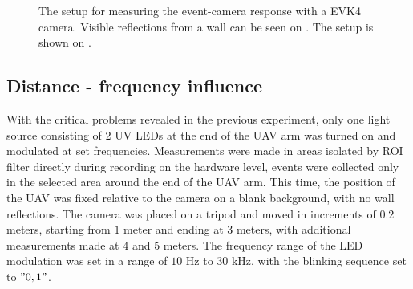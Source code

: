 \begin{figure}[H]
	\centering
	\caption{
  The setup for measuring the event-camera response with a EVK4 camera. Visible reflections from a wall can be seen on . The setup is shown on .
  }
	\label{fig:meas1}
\end{figure}


\subsection{Distance - frequency influence}

With the critical problems revealed in the previous experiment, only one light source consisting of 2 \ac{UV} \ac{LED}s at the end of the \ac{UAV} arm was turned on and
modulated at set frequencies.
Measurements were made in areas isolated by \ac{ROI} filter directly during recording on the hardware level, events were collected only in the
selected area around the end of the \ac{UAV} arm.
This time, the position of the \ac{UAV} was fixed relative to the camera on a blank background, with no wall reflections. The camera was placed on a tripod
and moved in increments of $0.2$ meters, starting from $1$ meter and ending at $3$ meters, with additional measurements made
at $4$ and $5$ meters.
The frequency range of the LED modulation was set in a range of $10$ Hz to $30$ kHz, with the blinking sequence set to $"0, 1"$.

